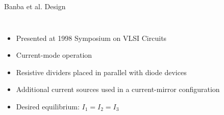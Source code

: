 \documentclass[aspectratio=1610]{beamer} %
\begin{document}
\begin{frame}{Banba et al. Design}{}
    \normalsize
    \begin{columns}[c]
        \begin{itemize}
            \item Presented at 1998 Symposium on VLSI Circuits
            \item Current-mode operation
            \item Resistive dividers placed in parallel with diode devices
            \item Additional current sources used in a current-mirror configuration
            \item Desired equilibrium: \(I_1 = I_2 = I_3\)
        \end{itemize}
    

\end{columns}
\end{frame}
\end{document}
